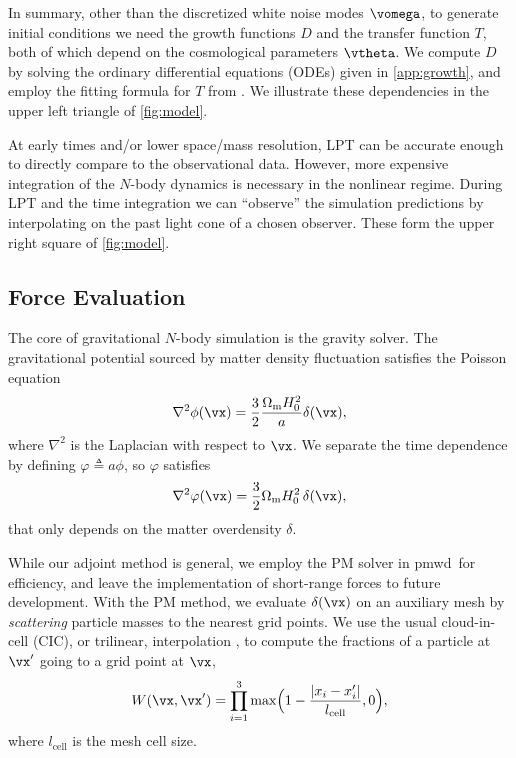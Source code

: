 \documentclass[modern, trackchanges, dvipsnames]{aastex631}
\newcommand{\pmwd}{{\usefont{T1}{nova}{m}{sl}pmwd}}
\newcommand{\Omegam}{\Omega_\mathrm{m}}
\begin{document}
In summary, other than the discretized white noise modes $\vomega$, to
generate initial conditions we need the growth functions $D$ and the
transfer function $T$, both of which depend on the cosmological
parameters $\vtheta$.
We compute $D$ by solving the ordinary differential equations (ODEs)
given in \autoref{app:growth}, and employ the fitting formula for $T$
from \citet{EisensteinHu1998}.
We illustrate these dependencies in the upper left triangle of
\autoref{fig:model}.

At early times and/or lower space/mass resolution, LPT can be accurate
enough to directly compare to the observational data.
However, more expensive integration of the $N$-body dynamics is
necessary in the nonlinear regime.
During LPT and the time integration we can ``observe'' the simulation
predictions by interpolating on the past light cone of a chosen
observer.
These form the upper right square of \autoref{fig:model}.


\vspace{1em}
\subsection{Force Evaluation}
\label{sec:force}

The core of gravitational $N$-body simulation is the gravity solver.
The gravitational potential sourced by matter density fluctuation
satisfies the Poisson equation
%
\begin{equation}
\nabla^2 \phi(\vx) = \frac32 \frac{\Omegam H_0^2}{a} \delta(\vx),
\end{equation}
%
where $\nabla^2$ is the Laplacian with respect to $\vx$.
We separate the time dependence by defining $\varphi \triangleq a \phi$,
so $\varphi$ satisfies
%
\begin{equation}
\nabla^2 \varphi(\vx) = \frac32 \Omegam H_0^2 \, \delta(\vx),
\end{equation}
%
that only depends on the matter overdensity $\delta$.

While our adjoint method is general, we employ the PM solver in \pmwd\
for efficiency, and leave the implementation of short-range forces to
future development.
With the PM method, we evaluate $\delta(\vx)$ on an auxiliary mesh by
\emph{scattering} particle masses to the nearest grid points.
We use the usual cloud-in-cell (CIC), or trilinear, interpolation
\citep{HockneyEastwood1988}, to compute the fractions of a particle at
$\vx'$ going to a grid point at $\vx$,
%
\begin{equation}
W(\vx, \vx') = \prod_{i=1}^3
  \max \Bigl( 1 - \frac{|x_i-x'_i|}{l_\mathrm{cell}}, 0 \Bigr),
\label{cic}
\end{equation}
%
where $l_\mathrm{cell}$ is the mesh cell size.
\end{document}
